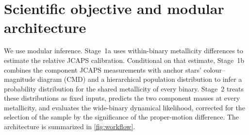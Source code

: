 \section{Scientific objective and modular architecture}
\label{sec:overview}

We use modular inference. Stage~1a uses
within-binary metallicity differences to estimate the relative JCAPS
calibration.  Conditional on that estimate, Stage~1b combines the component
JCAPS measurements with anchor stars' colour--magnitude diagram (CMD) and a
hierarchical population distribution to infer a probability distribution for
the shared metallicity of every binary.  Stage~2 treats these distributions as
fixed inputs, predicts the two component masses at every metallicity, and
evaluates the wide-binary dynamical likelihood, corrected for the selection of the sample by the significance of the proper-motion difference. The architecture is summarized in
\cref{fig:workflow}.

